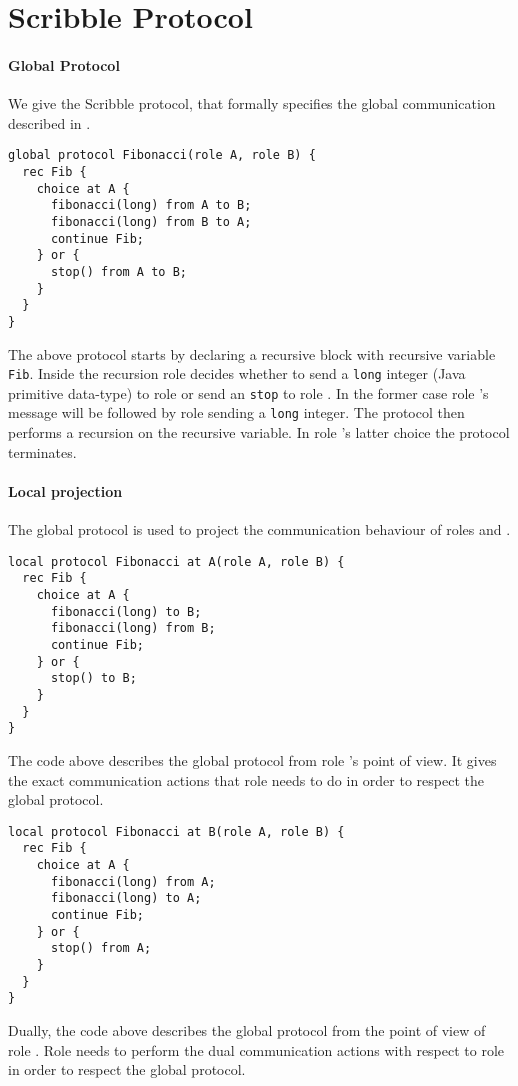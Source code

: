 \section{Scribble Protocol}
\label{sec:scribble}

\paragraph{Global Protocol}
We give the Scribble protocol, that formally specifies the
global communication described in .
%
\begin{lstlisting}[caption={Global Protocol}]
global protocol Fibonacci(role A, role B) {
  rec Fib {
    choice at A {
      fibonacci(long) from A to B;
      fibonacci(long) from B to A;
      continue Fib;
    } or {
      stop() from A to B;
    }
  }
}
\end{lstlisting}

The above protocol starts by declaring a recursive block
with recursive variable \lstinline|Fib|.
Inside the recursion role \A decides whether to send
a \lstinline|long| integer (Java primitive data-type)
to role \B or send an \lstinline|stop| to role \B.
In the former case role \A's message will be followed
by role \B sending a \lstinline|long| integer. The protocol
then performs a recursion on the recursive variable.
In role \A's latter choice the protocol terminates.

\paragraph{Local projection}
The global protocol is used to project the communication
behaviour of roles \A and \B.

\begin{lstlisting}[caption={Local Protocol for Role \A}]
local protocol Fibonacci at A(role A, role B) {
  rec Fib {
    choice at A {
      fibonacci(long) to B;
      fibonacci(long) from B;
      continue Fib;
    } or {
      stop() to B;
    }
  }
}
\end{lstlisting}

The code above describes the global protocol from role \A's
point of view. It gives the exact communication actions that
role \A needs to do in order to respect the global protocol.

\begin{lstlisting}[caption={Local Protocol for Role \B}]
local protocol Fibonacci at B(role A, role B) {
  rec Fib {
    choice at A {
      fibonacci(long) from A;
      fibonacci(long) to A;
      continue Fib;
    } or {
      stop() from A;
    }
  }
}
\end{lstlisting}

Dually, the code above describes the global protocol from
the point of view of role \B. Role \B needs to perform
the dual communication actions with respect to role \A
in order to respect the global protocol.



